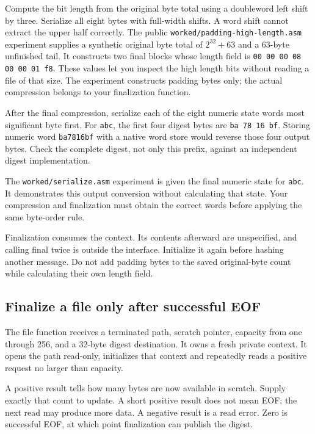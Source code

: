

Compute the bit length from the original byte total using a doubleword left
shift by three. Serialize all eight bytes with full-width shifts. A word shift
cannot extract the upper half correctly. The public
\texttt{worked/padding-high-length.asm} experiment supplies a synthetic original
byte total of $2^{32}+63$ and a 63-byte unfinished tail. It constructs two final
blocks whose length field is \texttt{00 00 00 08 00 00 01 f8}. These values let
you inspect the high length bits without reading a file of that size. The
experiment constructs padding bytes only; the actual compression belongs to
your finalization function.

After the final compression, serialize each of the eight numeric state words
most significant byte first. For \texttt{abc}, the first four digest bytes are
\texttt{ba 78 16 bf}. Storing numeric word \texttt{ba7816bf} with a native
word store would reverse those four output bytes. Check the complete digest,
not only this prefix, against an independent digest implementation.

The \texttt{worked/serialize.asm} experiment is given the final numeric state
for \texttt{abc}. It demonstrates this output conversion without calculating
that state. Your compression and finalization must obtain the correct words
before applying the same byte-order rule.



Finalization consumes the context. Its contents afterward are unspecified,
and calling final twice is outside the interface. Initialize it again before
hashing another message. Do not add padding bytes to the saved original-byte
count while calculating their own length field.

\subsection*{Finalize a file only after successful EOF}

The file function receives a terminated path, scratch pointer, capacity from one
through 256, and a 32-byte digest destination. It owns a fresh private context.
It opens the path read-only, initializes that context and repeatedly reads a
positive request no larger than capacity.

A positive result tells how many bytes are now available in scratch. Supply
exactly that count to update. A short positive result does not mean EOF; the next
read may produce more data. A negative result is a read error. Zero is successful
EOF, at which point finalization can publish the digest.

